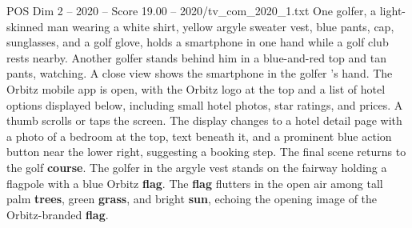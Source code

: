 \begin{textsample}{POS Dim 2 – 2020 – Score 19.00 – 2020/tv\_com\_2020\_1.txt}
One golfer, a light-skinned man wearing a white shirt, yellow argyle sweater vest, blue pants, cap, sunglasses, and a golf glove, holds a smartphone in one hand while a golf club rests nearby.
Another golfer stands behind him in a blue-and-red top and tan pants, watching.
A close view shows the smartphone in the golfer ’s hand.
The Orbitz mobile app is open, with the Orbitz logo at the top and a list of hotel options displayed below, including small hotel photos, star ratings, and prices.
A thumb scrolls or taps the screen.
The display changes to a hotel detail page with a photo of a bedroom at the top, text beneath it, and a prominent blue action button near the lower right, suggesting a booking step.
The final scene returns to the golf \textbf{course}.
The golfer in the argyle vest stands on the fairway holding a flagpole with a blue Orbitz \textbf{flag}.
The \textbf{flag} flutters in the open air among tall palm \textbf{trees}, green \textbf{grass}, and bright \textbf{sun}, echoing the opening image of the Orbitz-branded \textbf{flag}.

\end{textsample}
